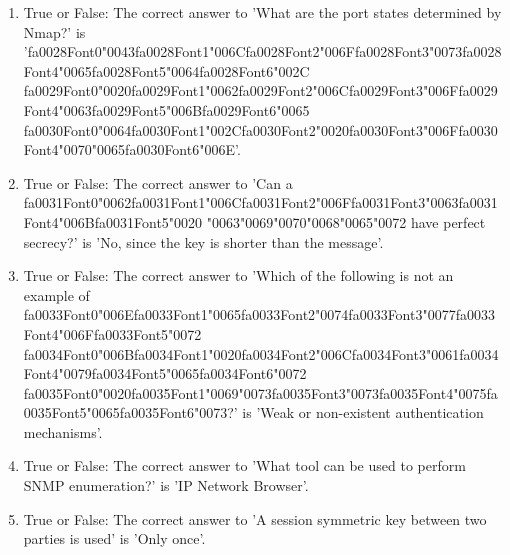 \documentclass[12pt]{article}
\begin{document}
\begin{enumerate}[label=\arabic*.]
\item True or False: The correct answer to 'What are the port states determined by Nmap?' is '{\csname fa0028Font0\endcsname\char"0043}{\csname fa0028Font1\endcsname\char"006C}{\csname fa0028Font2\endcsname\char"006F}{\csname fa0028Font3\endcsname\char"0073}{\csname fa0028Font4\endcsname\char"0065}{\csname fa0028Font5\endcsname\char"0064}{\csname fa0028Font6\endcsname\char"002C} {\csname fa0029Font0\endcsname\char"0020}{\csname fa0029Font1\endcsname\char"0062}{\csname fa0029Font2\endcsname\char"006C}{\csname fa0029Font3\endcsname\char"006F}{\csname fa0029Font4\endcsname\char"0063}{\csname fa0029Font5\endcsname\char"006B}{\csname fa0029Font6\endcsname\char"0065} {\csname fa0030Font0\endcsname\char"0064}{\csname fa0030Font1\endcsname\char"002C}{\csname fa0030Font2\endcsname\char"0020}{\csname fa0030Font3\endcsname\char"006F}{\csname fa0030Font4\endcsname\char"0070}{\char"0065}{\csname fa0030Font6\endcsname\char"006E}'.
\item True or False: The correct answer to 'Can a {\csname fa0031Font0\endcsname\char"0062}{\csname fa0031Font1\endcsname\char"006C}{\csname fa0031Font2\endcsname\char"006F}{\csname fa0031Font3\endcsname\char"0063}{\csname fa0031Font4\endcsname\char"006B}{\csname fa0031Font5\endcsname\char"0020} {\char"0063}{\char"0069}{\char"0070}{\char"0068}{\char"0065}{\char"0072} have perfect secrecy?' is 'No, since the key is shorter than the message'.
\item True or False: The correct answer to 'Which of the following is not an example of {\csname fa0033Font0\endcsname\char"006E}{\csname fa0033Font1\endcsname\char"0065}{\csname fa0033Font2\endcsname\char"0074}{\csname fa0033Font3\endcsname\char"0077}{\csname fa0033Font4\endcsname\char"006F}{\csname fa0033Font5\endcsname\char"0072} {\csname fa0034Font0\endcsname\char"006B}{\csname fa0034Font1\endcsname\char"0020}{\csname fa0034Font2\endcsname\char"006C}{\csname fa0034Font3\endcsname\char"0061}{\csname fa0034Font4\endcsname\char"0079}{\csname fa0034Font5\endcsname\char"0065}{\csname fa0034Font6\endcsname\char"0072} {\csname fa0035Font0\endcsname\char"0020}{\csname fa0035Font1\endcsname\char"0069}{\char"0073}{\csname fa0035Font3\endcsname\char"0073}{\csname fa0035Font4\endcsname\char"0075}{\csname fa0035Font5\endcsname\char"0065}{\csname fa0035Font6\endcsname\char"0073}?' is 'Weak or non-existent authentication mechanisms'.
\item True or False: The correct answer to 'What tool can be used to perform SNMP enumeration?' is 'IP Network Browser'.
\item True or False: The correct answer to 'A session symmetric key between two parties is used' is 'Only once'.

\end{enumerate}
\end{document}
